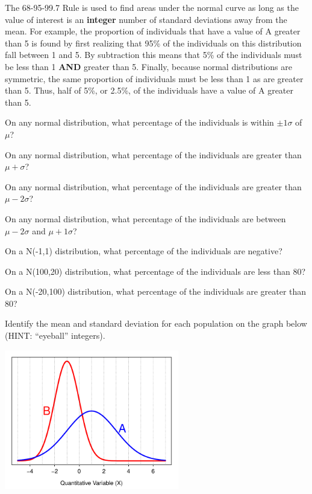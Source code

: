 \documentclass[10pt,openany]{book}\usepackage[]{graphicx}\usepackage[]{color}
\begin{document}
The 68-95-99.7 Rule is used to find areas under the normal curve as long as the value of interest is an \textbf{integer} number of standard deviations away from the mean.  For example, the proportion of individuals that have a value of A greater than 5 is found by first realizing that 95\% of the individuals on this distribution fall between 1 and 5.  By subtraction this means that 5\% of the individuals must be less than 1 \textbf{AND} greater than 5.  Finally, because normal distributions are symmetric, the same proportion of individuals must be less than 1 as are greater than 5.  Thus, half of 5\%, or 2.5\%, of the individuals have a value of A greater than 5.


\begin{exsection}
  \item \label{revex:quNorm68} On any normal distribution, what percentage of the individuals is within $\pm1\sigma$ of $\mu$? 
  \item \label{revex:quNorm68gt} On any normal distribution, what percentage of the individuals are greater than $\mu+\sigma$? 
  \item \label{revex:quNorm95gt} On any normal distribution, what percentage of the individuals are greater than $\mu-2\sigma$? 
  \item \label{revex:quNormbt6895} On any normal distribution, what percentage of the individuals are between $\mu-2\sigma$ and $\mu+1\sigma$? 
  \item \label{revex:quNorm84} On a N(-1,1) distribution, what percentage of the individuals are negative? 
  \item \label{revex:quNorm16} On a N(100,20) distribution, what percentage of the individuals are less than 80? 
  \item \label{revex:quNorm16a} On a N(-20,100) distribution, what percentage of the individuals are greater than 80? 
  \item \label{revex:quNormAB} Identify the mean and standard deviation for each population on the graph below (HINT: ``eyeball'' integers). 

    \begin{center}
      \includegraphics[width=3in]{Figs/Guess-1}
    \end{center}
\end{exsection}
\end{document}
